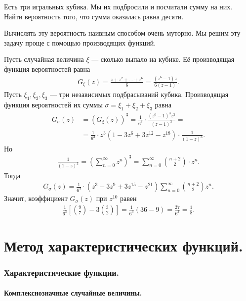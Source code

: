 \documentclass[../main.tex]{subfiles}
\begin{document}
\begin{exmpl}
 Есть три игральных кубика. Мы их подбросили и посчитали сумму на них. Найти вероятность того, что сумма оказалась равна десяти.

 Вычислять эту вероятность наивным способом очень муторно. Мы решим эту задачу проще с помощью производящих функций.

 Пусть случайная величина $ \xi $ --- сколько выпало на кубике. Её производящая функция вероятностей равна
 \begin{align*}
  G_\xi(z) = \frac{z + z^{2} + \ldots + z^{6}}{6} = \frac{(z^{6}-1)z}{6(z-1)}.
 \end{align*} Пусть $ \xi_1,\xi_2,\xi_3 $ --- три независимых подбрасываний кубика. Производящая функция вероятностей их суммы $ \sigma = \xi_1 + \xi_2 + \xi_3 $ равна
 \begin{align*}
  G_{\sigma}(z) &= (G_\xi(z))^{3} = \frac{1}{6^{3}} \cdot \frac{(z^{6}-1)^{3}z^{3}}{(z-1)^{3}} = \\
  &= \frac{1}{6^{3}} \cdot z^{3}(1 - 3z^{6} + 3z^{12} - z^{18}) \cdot \frac{1}{(1-z)^{3}}.
 \end{align*} Но
 \begin{align*}
  \frac{1}{(1-z)^{3}} = \left( \sum_{n=0}^{\infty}z^{n} \right)^{3} = \sum_{n=0}^{\infty} \binom {n+2} 2 \cdot z^{n}.
 \end{align*} Тогда
 \begin{align*}
  G_{\sigma}(z) =\frac{1}{6^{3}} \cdot (z^{3}-3z^{9}+3z^{15}-z^{21}) \sum_{n=0}^{\infty}\binom {n+2} 2 z^{n}.
 \end{align*} Значит, коэффициент $ G_\sigma(z) $ при $ z^{10} $ равен
 \begin{align*}
  \frac{1}{6^{3}} \left[ \binom 9 7 - 3 \binom 3 2 \right] = \frac{1}{6^{3}} \left( 36 - 9 \right) = \frac{27}{6^{3}} = \frac{1}{8}.
 \end{align*}
\end{exmpl}

\newpage
\part{Метод характеристических функций.}

\section{Характеристические функции.}

\subsection{Комплекснозначные случайные величины.}
\end{document}

